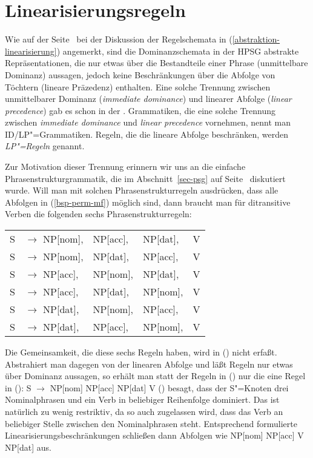 \section{Linearisierungsregeln}

Wie auf der Seite~\pageref{abstraktion-linearisierung} bei der Diskussion der Regelschemata in
(\ref{abstraktion-linearisierung}) angemerkt, sind die Dominanzschemata in der HPSG abstrakte
Repräsentationen, die nur etwas über die Bestandteile einer Phrase (unmittelbare Dominanz)
aussagen, jedoch keine Beschränkungen über die Abfolge von Töchtern (lineare Präzedenz)
enthalten. Eine solche Trennung zwischen unmittelbarer Dominanz (\emph{immediate dominance})
und linearer Abfolge (\emph{linear precedence}) gab es schon in der \gpsg
\citep*{GKPS85a}. Grammatiken, die eine solche Trennung zwischen \emph{immediate dominance} und
\emph{linear precedence} vornehmen, nennt man ID/LP"=Grammatiken. Regeln, die die lineare Abfolge
beschränken, werden \emph{LP"=Regeln} genannt.

Zur Motivation dieser Trennung erinnern wir uns an die einfache Phrasenstrukturgrammatik,
die im Abschnitt~\ref{sec-psg} auf Seite~\pageref{ditrans-ps-regeln} diskutiert wurde. Will man
mit solchen Phrasenstrukturregeln ausdrücken, dass alle Abfolgen in (\ref{bsp-perm-mf}) möglich sind,
dann braucht man für ditransitive Verben die folgenden sechs Phrasenstrukturregeln:
\ea
\begin{tabular}[t]{@{}l@{ }l@{ }l@{ }l@{ }l}
S  & $\to$ NP[nom],& NP[acc], & NP[dat], & V\\
S  & $\to$ NP[nom],& NP[dat], & NP[acc], & V\\
S  & $\to$ NP[acc],& NP[nom], & NP[dat], & V\\
S  & $\to$ NP[acc],& NP[dat], & NP[nom], & V\\
S  & $\to$ NP[dat],& NP[nom], & NP[acc], & V\\
S  & $\to$ NP[dat],& NP[acc], & NP[nom], & V\\
\end{tabular}
\z
Die Gemeinsamkeit, die diese sechs Regeln haben, wird in () nicht erfaßt. Abstrahiert man
dagegen von der linearen Abfolge und läßt Regeln nur etwas über Dominanz aussagen, so erhält man
statt der Regeln in () nur die eine Regel in ():
 \ea
S $\to$ NP[nom] NP[acc] NP[dat] V
\z
() besagt, dass der S"=Knoten drei Nominalphrasen und ein Verb in beliebiger Reihenfolge
dominiert. Das ist natürlich zu wenig restriktiv, da so auch zugelassen wird, dass das Verb an beliebiger
Stelle zwischen den Nominalphrasen steht. Entsprechend formulierte Linearisierungsbeschränkungen
schließen dann Abfolgen wie NP[nom] NP[acc] V NP[dat] aus.


